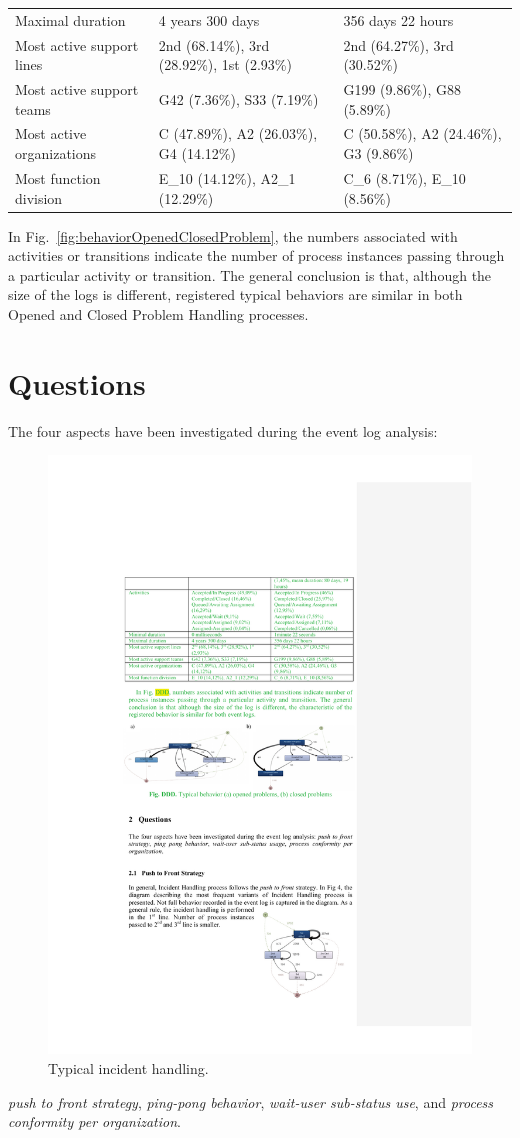 \documentclass[lnbip]{svmultln}
\begin{document}
\begin{table}
\begin{center}
\begin{tabular}{p{}p{}p{}}
Maximal duration	& 4 years 300 days	& 356 days 22 hours \\
Most active \newline support lines	& 
	2nd (68.14\%), 3rd (28.92\%), \newline 1st (2.93\%)& 
	2nd (64.27\%), 3rd (30.52\%) \\
Most active support teams	&
	G42 (7.36\%), S33 (7.19\%) &
	G199 (9.86\%), G88 (5.89\%) \\
Most active \newline organizations	&
	C (47.89\%), A2 (26.03\%), \newline G4 (14.12\%)&
	C (50.58\%), A2 (24.46\%), \newline G3 (9.86\%) \\
Most function \newline division	&
	E\_10 (14.12\%), A2\_1 (12.29\%)&
	C\_6 (8.71\%), E\_10 (8.56\%)\\[2pt]
\hline
\end{tabular}
\end{center}
\end{table}
In Fig.~\ref{fig:behaviorOpenedClosedProblem}, the numbers associated with activities or  transitions indicate the number of process instances passing through a particular activity or transition. The general conclusion is that, although the size of the logs is different,  registered typical behaviors  are similar in both Opened and Closed Problem Handling processes.


\section{Questions}
\label{sec:questions}
The four aspects have been investigated during the event log analysis: \begin{figure}
  \vspace{-20pt}
  \begin{center}
		\includegraphics[width=.4\textwidth]{"figs/pic 6"}
  \end{center}
	\caption{Typical incident handling.}
	\label{fig:typicalIncidentHandling}
  \vspace{-40pt}
\end{figure}
\emph{push to front strategy}, \emph{ping-pong behavior}, \emph{wait-user sub-status use}, and \emph{process conformity per organization}.
\end{document}
